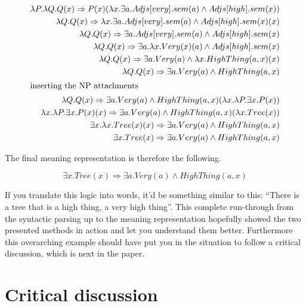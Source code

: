 \documentclass[12pt,twoside]{scrartcl}
\theoremstyle{plain}
\theoremstyle{definition}
\theoremstyle{remark}
\begin{document}
		\begin{alignat*}{1}
			\lambda P.\lambda Q.Q(x) \Rightarrow P(x)(\lambda x.\exists a.Adjs[very].sem(a) \wedge Adjs[high].sem(x)) \\
			\lambda Q.Q(x) \Rightarrow \lambda x.\exists a.Adjs[very].sem(a) \wedge Adjs[high].sem(x)(x) \\
			\lambda Q.Q(x) \Rightarrow \exists a.Adjs[very].sem(a) \wedge Adjs[high].sem(x) \\
			\lambda Q.Q(x) \Rightarrow \exists a.\lambda x.Very(x)(a) \wedge Adjs[high].sem(x) \\
			\lambda Q.Q(x) \Rightarrow \exists a.Very(a) \wedge \lambda x.HighThing(a, x)(x) \\
			\lambda Q.Q(x) \Rightarrow \exists a.Very(a) \wedge HighThing(a, x) \\
			\intertext{inserting the NP attachments}
			\lambda Q.Q(x) \Rightarrow \exists a.Very(a) \wedge HighThing(a, x)(\lambda x.\lambda P.\exists x.P(x)) \\
			\lambda x.\lambda P.\exists x.P(x)(x) \Rightarrow \exists a.Very(a) \wedge HighThing(a, x)(\lambda x.Tree(x)) \\
			\exists x.\lambda x.Tree(x)(x) \Rightarrow \exists a.Very(a) \wedge HighThing(a, x) \\
			\exists x.Tree(x) \Rightarrow \exists a.Very(a) \wedge HighThing(a, x)
		\end{alignat*}
		
		The final meaning representation is therefore the following.
		
		\[
			\exists x.Tree(x) \Rightarrow \exists a.Very(a) \wedge HighThing(a, x)
		\]
		
		If you translate this logic into words, it'd be something similar to this: ``There is a tree that is a high thing, a very high thing''. This complete run-through from the syntactic parsing up to the meaning representation hopefully showed the two presented methods in action and let you understand them better. Furthermore this overarching example should have put you in the situation to follow a critical discussion, which is next in the paper.
		
\section{Critical discussion}
\label{sec:critDiscussion}

\end{document}
